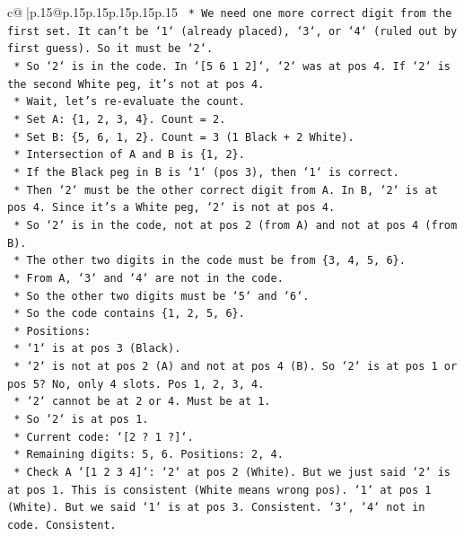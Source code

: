\documentclass{article}
\begin{document}
{\begin{supertabular}{c@{$\;$}|p{.15\linewidth}@{}p{.15\linewidth}p{.15\linewidth}p{.15\linewidth}p{.15\linewidth}p{.15\linewidth}}
{{{\texttt{    *   We need one more correct digit from the first set. It can't be `1` (already placed), `3`, or `4` (ruled out by first guess). So it must be `2`.} \\
\texttt{    *   So `2` is in the code. In `{[}5 6 1 2{]}`, `2` was at pos 4. If `2` is the second White peg, it's not at pos 4.} \\
\texttt{    *   Wait, let's re{-}evaluate the count.} \\
\texttt{    *   Set A: \{1, 2, 3, 4\}. Count = 2.} \\
\texttt{    *   Set B: \{5, 6, 1, 2\}. Count = 3 (1 Black + 2 White).} \\
\texttt{    *   Intersection of A and B is \{1, 2\}.} \\
\texttt{    *   If the Black peg in B is `1` (pos 3), then `1` is correct.} \\
\texttt{    *   Then `2` must be the other correct digit from A. In B, `2` is at pos 4. Since it's a White peg, `2` is not at pos 4.} \\
\texttt{    *   So `2` is in the code, not at pos 2 (from A) and not at pos 4 (from B).} \\
\texttt{    *   The other two digits in the code must be from \{3, 4, 5, 6\}.} \\
\texttt{    *   From A, `3` and `4` are not in the code.} \\
\texttt{    *   So the other two digits must be `5` and `6`.} \\
\texttt{    *   So the code contains \{1, 2, 5, 6\}.} \\
\texttt{    *   Positions:} \\
\texttt{        *   `1` is at pos 3 (Black).} \\
\texttt{        *   `2` is not at pos 2 (A) and not at pos 4 (B). So `2` is at pos 1 or pos 5? No, only 4 slots. Pos 1, 2, 3, 4.} \\
\texttt{        *   `2` cannot be at 2 or 4. Must be at 1.} \\
\texttt{        *   So `2` is at pos 1.} \\
\texttt{        *   Current code: `{[}2 ? 1 ?{]}`.} \\
\texttt{        *   Remaining digits: 5, 6. Positions: 2, 4.} \\
\texttt{        *   Check A `{[}1 2 3 4{]}`: `2` at pos 2 (White). But we just said `2` is at pos 1. This is consistent (White means wrong pos). `1` at pos 1 (White). But we said `1` is at pos 3. Consistent. `3`, `4` not in code. Consistent.} \\
}}}
\end{supertabular}}
\end{document}
